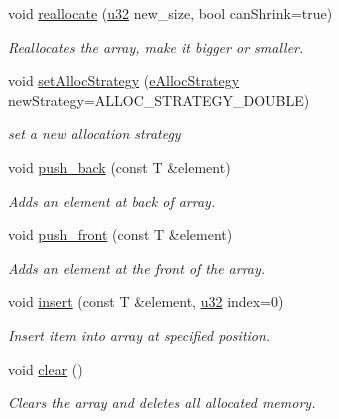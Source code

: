 \begin{DoxyCompactItemize}
void \hyperlink{classirr_1_1core_1_1array_ada5735f409eca82b9031d993ee8b31c3}{reallocate} (\hyperlink{namespaceirr_a0416a53257075833e7002efd0a18e804}{u32} new\+\_\+size, bool can\+Shrink=true)
\begin{DoxyCompactList}\small\item\em Reallocates the array, make it bigger or smaller. \end{DoxyCompactList}\item 
void \hyperlink{classirr_1_1core_1_1array_a7aef3e5dbf91f8d1e8f365039e2497ae}{set\+Alloc\+Strategy} (\hyperlink{namespaceirr_1_1core_aa2e91971d5e6e84de235bfabe3c7adba}{e\+Alloc\+Strategy} new\+Strategy=A\+L\+L\+O\+C\+\_\+\+S\+T\+R\+A\+T\+E\+G\+Y\+\_\+\+D\+O\+U\+B\+LE)
\begin{DoxyCompactList}\small\item\em set a new allocation strategy \end{DoxyCompactList}\item 
void \hyperlink{classirr_1_1core_1_1array_ad2c9dff8592b95c25c59f5383fc633fe}{push\+\_\+back} (const T \&element)
\begin{DoxyCompactList}\small\item\em Adds an element at back of array. \end{DoxyCompactList}\item 
void \hyperlink{classirr_1_1core_1_1array_a31b686ce4b1ebae930f22bc40d30efbd}{push\+\_\+front} (const T \&element)
\begin{DoxyCompactList}\small\item\em Adds an element at the front of the array. \end{DoxyCompactList}\item 
void \hyperlink{classirr_1_1core_1_1array_a3b0f73c95dd449a4de576c6b1943566c}{insert} (const T \&element, \hyperlink{namespaceirr_a0416a53257075833e7002efd0a18e804}{u32} index=0)
\begin{DoxyCompactList}\small\item\em Insert item into array at specified position. \end{DoxyCompactList}\item 
\mbox{\label{classirr_1_1core_1_1array_a236e08ca44ddf3c2b47b726f90db8d39}} 
void \hyperlink{classirr_1_1core_1_1array_a236e08ca44ddf3c2b47b726f90db8d39}{clear} ()
\begin{DoxyCompactList}\small\item\em Clears the array and deletes all allocated memory. \end{DoxyCompactList}\item 

\end{DoxyCompactItemize}
